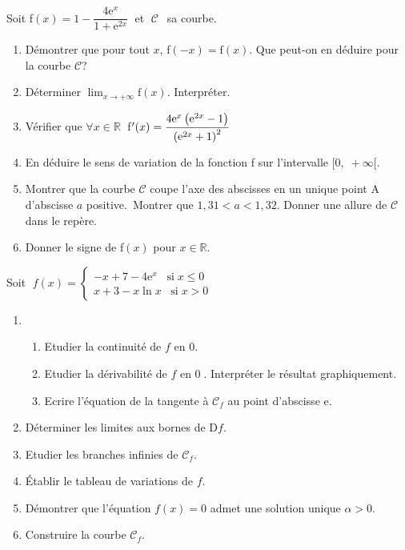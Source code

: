 \begin{exercice} 
Soit  f$(x)=1-\dfrac{4\text{e}^{x}}{1+\text{e}^{2x}} \;$ et $\; \mathcal{C}\; $\ sa courbe. 
\begin{enumerate}
\item Démontrer que pour tout   $ x $, f$ (-x)=\text{f}(x) $. Que peut-on en déduire pour la courbe  $ \mathcal{C} $?
\item Déterminer $\displaystyle \lim_{x \to +\infty }{\text{f}(x)} $. 
Interpréter.
\item Vérifier que $ \forall x \in \mathbb{R}\;$\; f$ ^{\prime}(x)=\dfrac{4\text{e}^{x}\left(\text{e}^{2x}-1\right)}{\left(\text{e}^{2x}+1\right)^{2}} $
\item En déduire le sens de variation de la fonction f sur l'intervalle \;$ [0,\;+\infty[ $.
\item Montrer que la courbe \;$ \mathcal{C} $\; coupe  l'axe des abscisses en un unique point A \;d'abscisse \; $ a $\; positive.\ Montrer que \; $1,31 <  a < 1,32$. Donner une allure de   $ \mathcal{C} $ dans le repère.
\item Donner le signe de f$ (x) $  pour   $ x  \in \mathbb{R}$.
\end{enumerate}
\end{exercice}

\begin{exercice} 
 Soit   
 $\; f(x)= \left\{\begin{array}{l}  -x+7-4\text{e}^{x}\;\;\;\text{si}\;x \leq 0  \\[0.25cm] 
 x+3-x\ln x\;\;\;\text{si} \; x >0
\end{array}\right.$
 \begin{enumerate}
 \item
\begin{enumerate} 
\item Etudier la continuité de $ f $  en $ 0 $.
\item Etudier la dérivabilité de $ f $  en $ 0 \;$. Interpréter le résultat graphiquement. 
\item Ecrire l'équation de la tangente à $ \mathcal{C}_{f} $ au point d'abscisse $ \text{e} $.
\end{enumerate}
\item Déterminer les limites aux bornes de D$ f $.
\item Etudier les  branches infinies de $ \mathcal{C}_{f} $.
\item Établir le tableau de variations de $ f $. 
\item Démontrer que l'équation $ f(x)=0 $  admet une solution unique $ \alpha >0$.
\item Construire la courbe $ \mathcal{C}_{f} $. 
\end{enumerate}
\end{exercice}

